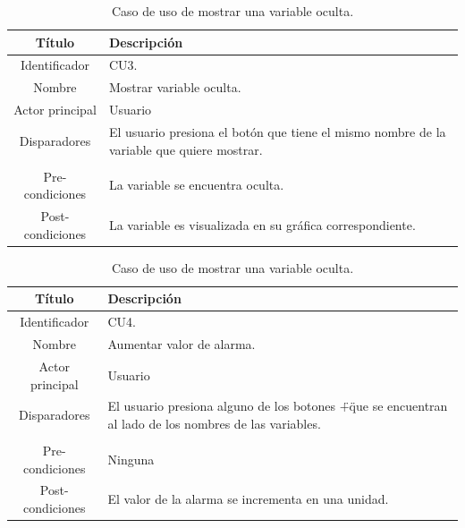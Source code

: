 \begin{table}[htpb]
	\centering
	\caption{Caso de uso de mostrar una variable oculta.}
	\centering
	\begin{tabular}{c p{}}    
		\toprule
		\textbf{Título }     & \textbf{Descripción} \\
		\midrule
		Identificador		&	CU3. \\
		Nombre				& 	Mostrar variable oculta. \\
		Actor principal		&   Usuario \\
		Disparadores		&   El usuario presiona el botón que tiene el mismo nombre de la variable que quiere mostrar. \\
\\
		Pre-condiciones		&   La variable se encuentra oculta. \\
		Post-condiciones	&   La variable es visualizada en su gráfica correspondiente.\\
		\bottomrule
	\end{tabular}
\label{tab:caso-mostrar}
\end{table}

\begin{table}[htpb]
	\centering
	\caption{Caso de uso de mostrar una variable oculta.}
	\centering
	\begin{tabular}{c p{}}    
		\toprule
		\textbf{Título }     & \textbf{Descripción} \\
		\midrule
		Identificador		&	CU4. \\
		Nombre				& 	Aumentar valor de alarma. \\
		Actor principal		&   Usuario \\
		Disparadores		&   El usuario presiona alguno de los botones \"+\" que se encuentran al lado de los nombres de las variables. \\
\\
		Pre-condiciones		&   Ninguna \\
		Post-condiciones	&   El valor de la alarma se incrementa en una unidad.\\
		\bottomrule
	\end{tabular}
\label{tab:caso-aumentar}
\end{table}

